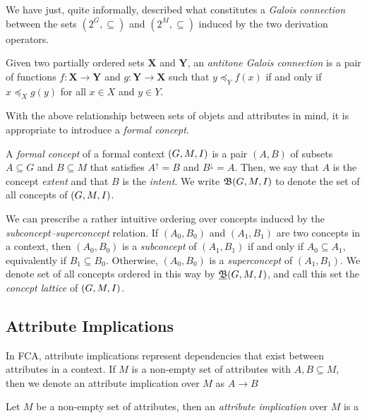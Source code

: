 We have just, quite informally, described what constitutes a \textit{Galois connection} between the sets $(2^G, \subseteq)$ and $(2^M, \subseteq)$ induced by the two derivation operators. 

\begin{definition}
  \label{definition:galois-connection} 
  Given two partially ordered sets $\mathbf{X}$ and $\mathbf{Y}$, an \textit{antitone Galois connection} is a pair of functions $f:\mathbf{X}\!\to\!\mathbf{Y}$ and $g:\mathbf{Y}\!\to\!\mathbf{X}$ such that $y \preceq_Y f(x)$ if and only if $x \preceq_X g(y)$ for all $x\in X$ and $y\in Y$.
\end{definition}

With the above relationship between sets of objets and attributes in mind, it is appropriate to introduce a \textit{formal concept}. 

\begin{definition}
  \label{definition:formal-concept} 
  A \textit{formal concept} of a formal context $(G,M,\mathrel{I})$ is a pair $(A,B)$ of subsets $A \subseteq G$ and $B \subseteq M$ that satisfies $A^\uparrow = B$ and $B^\downarrow = A$. Then, we say that $A$ is the concept \textit{extent} and that $B$ is the \textit{intent}. We write $\mathfrak{B}(G,M,I)$ to denote the set of all concepts of $(G,M,I)$.
\end{definition}

We can prescribe a rather intuitive ordering over concepts induced by the \textit{subconcept–superconcept} relation. If $(A_0, B_0)$ and $(A_1, B_1)$ are two concepts in a context, then $(A_0, B_0)$ is a \textit{subconcept} of $(A_1, B_1)$ if and only if $A_0 \subseteq A_1$, equivalently if $B_1 \subseteq B_0$. Otherwise, $(A_0, B_0)$ is a \textit{superconcept} of $(A_1, B_1)$. We denote set of all concepts ordered in this way by $\underline{{\mathfrak B}} (G,M,\mathrel{I})$, and call this set the \textit{concept lattice} of $(G,M,\mathrel{I})$. 

\subsection{Attribute Implications}
\label{subsection:attribute-implications}

In FCA, attribute implications represent dependencies that exist between attributes in a context. If $M$ is a non-empty set of attributes with $A, B \subseteq M$, then we denote an attribute implication over $M$ as $A \rightarrow B$ 

\begin{definition}
     \label{definition:attribute-implication}
     Let $M$ be a non-empty set of attributes, then an \emph{attribute implication} over $M$ is a
\end{definition}




